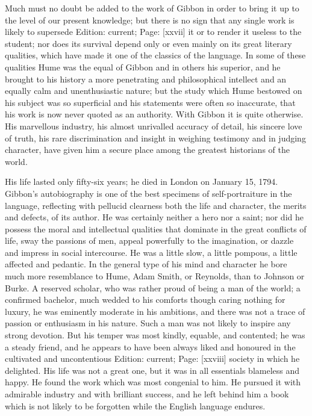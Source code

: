 Much must no doubt be added to the work of Gibbon in order to bring it up to the level of our present knowledge; but there is no sign that any single work is likely to supersede Edition: current; Page: [xxvii] it or to render it useless to the student; nor does its survival depend only or even mainly on its great literary qualities, which have made it one of the classics of the language. In some of these qualities Hume was the equal of Gibbon and in others his superior, and he brought to his history a more penetrating and philosophical intellect and an equally calm and unenthusiastic nature; but the study which Hume bestowed on his subject was so superficial and his statements were often so inaccurate, that his work is now never quoted as an authority. With Gibbon it is quite otherwise. His marvellous industry, his almost unrivalled accuracy of detail, his sincere love of truth, his rare discrimination and insight in weighing testimony and in judging character, have given him a secure place among the greatest historians of the world.

His life lasted only fifty-six years; he died in London on January 15, 1794. Gibbon\texthebrew{}’s autobiography is one of the best specimens of self-portraiture in the language, reflecting with pellucid clearness both the life and character, the merits and defects, of its author. He was certainly neither a hero nor a saint; nor did he possess the moral and intellectual qualities that dominate in the great conflicts of life, sway the passions of men, appeal powerfully to the imagination, or dazzle and impress in social intercourse. He was a little slow, a little pompous, a little affected and pedantic. In the general type of his mind and character he bore much more resemblance to Hume, Adam Smith, or Reynolds, than to Johnson or Burke. A reserved scholar, who was rather proud of being a man of the world; a confirmed bachelor, much wedded to his comforts though caring nothing for luxury, he was eminently moderate in his ambitions, and there was not a trace of passion or enthusiasm in his nature. Such a man was not likely to inspire any strong devotion. But his temper was most kindly, equable, and contented; he was a steady friend, and he appears to have been always liked and honoured in the cultivated and uncontentious Edition: current; Page: [xxviii] society in which he delighted. His life was not a great one, but it was in all essentials blameless and happy. He found the work which was most congenial to him. He pursued it with admirable industry and with brilliant success, and he left behind him a book which is not likely to be forgotten while the English language endures.

